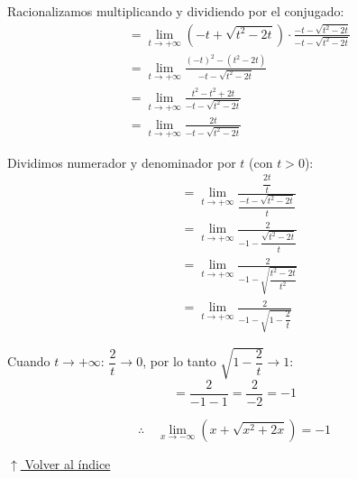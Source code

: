 \documentclass[12pt]{article}
\newcommand{\volverindice}{%
    \vspace{1em}%
    \begin{flushright}%
        \hyperlink{indice}{\small $\uparrow$ Volver al índice}%
    \end{flushright}%
}
\begin{document}
\begin{enumerate}[label=\alph*)]
    Racionalizamos multiplicando y dividiendo por el conjugado:
    \begin{align*}
        &= \lim_{t\to +\infty}\left(-t + \sqrt{t^2-2t}\right) \cdot \frac{-t - \sqrt{t^2-2t}}{-t - \sqrt{t^2-2t}} \\[0.5em]
        &= \lim_{t\to +\infty} \frac{(-t)^2 - (t^2-2t)}{-t - \sqrt{t^2-2t}} \\[0.5em]
        &= \lim_{t\to +\infty} \frac{t^2 - t^2 + 2t}{-t - \sqrt{t^2-2t}} \\[0.5em]
        &= \lim_{t\to +\infty} \frac{2t}{-t - \sqrt{t^2-2t}}
    \end{align*}

    Dividimos numerador y denominador por $t$ (con $t > 0$):
    \begin{align*}
        &= \lim_{t\to +\infty} \frac{\dfrac{2t}{t}}{\dfrac{-t - \sqrt{t^2-2t}}{t}} \\[0.8em]
        &= \lim_{t\to +\infty} \frac{2}{-1 - \dfrac{\sqrt{t^2-2t}}{t}} \\[0.8em]
        &= \lim_{t\to +\infty} \frac{2}{-1 - \sqrt{\dfrac{t^2-2t}{t^2}}} \\[0.8em]
        &= \lim_{t\to +\infty} \frac{2}{-1 - \sqrt{1-\dfrac{2}{t}}}
    \end{align*}

    Cuando $t \to +\infty$: $\dfrac{2}{t} \to 0$, por lo tanto $\sqrt{1-\dfrac{2}{t}} \to 1$:
    \[
        = \frac{2}{-1-1} = \frac{2}{-2} = -1
    \]

    \[
        \therefore\quad \lim_{x\to -\infty}\left(x + \sqrt{x^2+2x}\right) = -1
    \]
\end{enumerate}

\volverindice
\newpage
\end{document}
